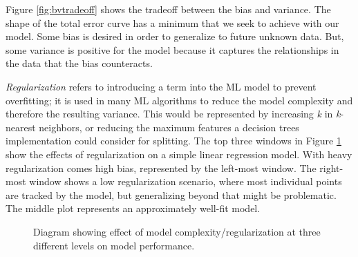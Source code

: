 Figure \ref{fig:bvtradeoff} shows the tradeoff between the bias and variance.
The shape of the total error curve has a minimum that we seek to achieve with
our model. Some bias is desired in order to generalize to future unknown data.
But, some variance is positive for the model because it captures the
relationships in the data that the bias counteracts. 

\textit{Regularization} refers to introducing a term into the \gls{ML} model to
prevent overfitting; it is used in many \gls{ML} algorithms to reduce the model
complexity and therefore the resulting variance.  This would be represented by
increasing \textit{k} in \textit{k}-nearest neighbors, or reducing the maximum
features a decision trees implementation could consider for splitting.  The top
three windows in Figure \ref{fig:complex} show the effects of regularization on
a simple linear regression model. With heavy regularization comes high bias,
represented by the left-most window.  The right-most window shows a low
regularization scenario, where most individual points are tracked by the model,
but generalizing beyond that might be problematic. The middle plot represents an 
approximately well-fit model.  

\begin{figure}[!htb]
  \centering
  \caption[Diagram of model performance with respect to model complexity]
          {Diagram showing effect of model complexity/regularization at three 
           different levels on model performance.}
  \label{fig:complex}
\end{figure}

